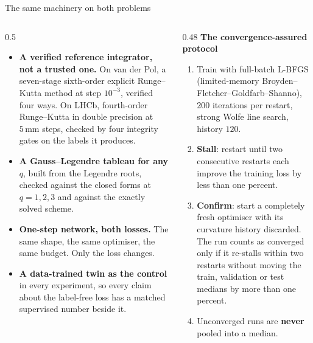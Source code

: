 \documentclass[aspectratio=169,10pt]{beamer}
\newcommand{\mm}{\ensuremath{\,\mathrm{mm}}}
\newcommand{\hl}[1]{{\color{accent}\textbf{#1}}}
\newcommand{\bad}[1]{{\color{warm}\textbf{#1}}}
\begin{document}
\begin{frame}[shrink=25]{The same machinery on both problems}
  \vspace{1mm}
  \begin{columns}[T]
    \begin{column}{0.5\textwidth}
      \begin{itemize}\small\setlength{\itemsep}{5pt}
        \item \hl{A verified reference integrator, not a trusted one.} On van
              der Pol, a seven-stage sixth-order explicit Runge--Kutta method at
              step $10^{-3}$, verified four ways. On LHCb, fourth-order
              Runge--Kutta in double precision at $5\mm$ steps, checked by four
              integrity gates on the labels it produces.
        \item \hl{A Gauss--Legendre tableau for any $q$}, built from the
              Legendre roots, checked against the closed forms at $q = 1, 2, 3$
              and against the exactly solved scheme.
        \item \hl{One-step network, both losses.} The same shape, the same
              optimiser, the same budget. Only the loss changes.
        \item \hl{A data-trained twin as the control} in every experiment, so
              every claim about the label-free loss has a matched supervised
              number beside it.
      \end{itemize}
    \end{column}
    \begin{column}{0.48\textwidth}
      \textbf{The convergence-assured protocol}
      \begin{enumerate}\small
        \item Train with full-batch L-BFGS (limited-memory
              Broyden--Fletcher--Goldfarb--Shanno), $200$ iterations per
              restart, strong Wolfe line search, history $120$.
        \item \hl{Stall}: restart until two consecutive restarts each improve the
              training loss by less than one percent.
        \item \hl{Confirm}: start a completely fresh optimiser with its curvature
              history discarded. The run counts as converged only if it
              re-stalls within two restarts without moving the train, validation
              or test medians by more than one percent.
        \item Unconverged runs are \bad{never} pooled into a median.

\end{enumerate}
\end{column}
\end{columns}
\end{frame}
\end{document}

